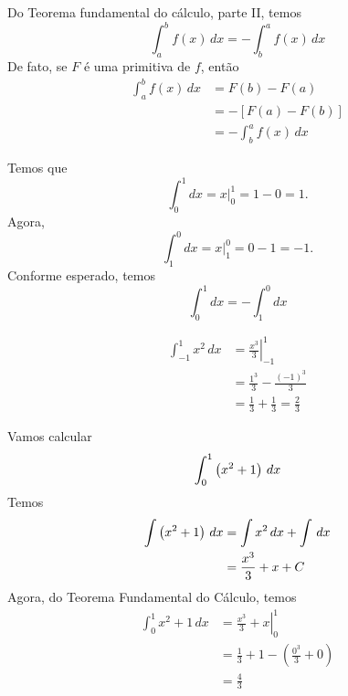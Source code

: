 \cleardoublepage\documentclass[../main.tex]{subfiles}
\begin{document}
\begin{obs}
  Do Teorema fundamental do cálculo, parte II, temos
  \begin{equation}
    \int_a^b f(x)\,dx = - \int_b^a f(x)\,dx
  \end{equation}
  De fato, se $F$ é uma primitiva de $f$, então
  \begin{align*}
    \int_a^b f(x)\,dx &= F(b) - F(a) \\
                      &= - \left[F(a) - F(b)\right] \\
                      &= - \int_b^a f(x)\,dx
  \end{align*}
\end{obs}

\begin{ex}
  Temos que
  \begin{equation*}
    \int_0^1 dx = \left. x\right|_0^1 = 1 - 0 = 1.
  \end{equation*}
  Agora,
  \begin{equation*}
    \int_1^0 dx = \left. x\right|_1^0 = 0 - 1 = -1.
  \end{equation*}
  Conforme esperado, temos
  \begin{equation*}
    \int_0^1 dx = - \int_1^0 dx
  \end{equation*}
\end{ex}
\begin{ex}
    \begin{align*}
    \int_{-1}^1 x^2\,dx &= \left.\frac{x^3}{3}\right|_{-1}^1 \\
                        &= \frac{1^3}{3} - \frac{(-1)^3}{3} \\
                        &= \frac{1}{3} + \frac{1}{3} = \frac{2}{3}
  \end{align*}
\end{ex}
\begin{ex}
  Vamos calcular
  \begin{equation*}
    \int_{0}^1 \left(x^2 + 1\right)\,dx
  \end{equation*}
  Temos
  \begin{align*}
    \int \left(x^2 + 1\right)\,dx &= \int x^2\,dx + \int \,dx\\
                     &= \frac{x^3}{3} + x + C
  \end{align*}
  Agora, do Teorema Fundamental do Cálculo, temos
  \begin{align*}
    \int_0^1 x^2+1\,dx &= \left. \frac{x^3}{3} + x\right|_0^1 \\
                       &= \frac{1}{3} + 1 - \left(\frac{0^3}{3} + 0\right) \\
                       &= \frac{4}{3}
  \end{align*}
\end{ex}
\end{document}
